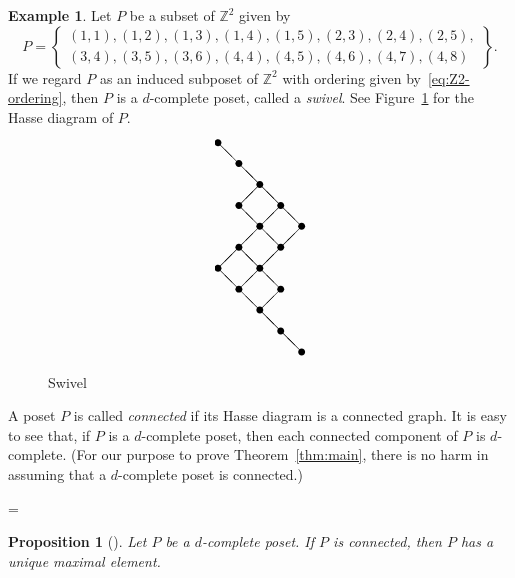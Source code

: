 \documentclass[10pt]{amsart}
\newtheorem{prop}[theo]{Proposition}
\theoremstyle{definition}
\newtheorem{exam}[theo]{Example}
\theoremstyle{remark}
\newcommand\Int{\mathbb{Z}}
\begin{document}
\begin{exam}
\label{ex:swivel}
Let $P$ be a subset of $\Int^2$ given by
$$
P =
\left\{ 
 \begin{array}{l}
 (1,1), (1,2), (1,3), (1,4), (1,5), (2,3), (2,4), (2,5), \\
 (3,4), (3,5), (3,6), (4,4), (4,5), (4,6), (4,7), (4,8)
 \end{array}
\right\}.
$$
If we regard $P$ as an induced subposet of $\Int^2$ with ordering given by~\eqref{eq:Z2-ordering}, 
then $P$ is a $d$-complete poset, called a \emph{swivel}.
See Figure~\ref{fig:Hasse_swivel} for the Hasse diagram of $P$.
\begin{figure}[!htb]
$$
\setlength{\unitlength}{1.5pt}
\begin{picture}(40,100)
\put(0,100){\circle*{3}}
\put(0,40){\circle*{3}}
\put(10,90){\circle*{3}}
\put(10,70){\circle*{3}}
\put(10,50){\circle*{3}}
\put(10,30){\circle*{3}}
\put(20,80){\circle*{3}}
\put(20,60){\circle*{3}}
\put(20,40){\circle*{3}}
\put(20,20){\circle*{3}}
\put(30,70){\circle*{3}}
\put(30,50){\circle*{3}}
\put(30,30){\circle*{3}}
\put(30,10){\circle*{3}}
\put(40,60){\circle*{3}}
\put(40,0){\circle*{3}}
\put(0,100){\line(1,-1){10}}
\put(0,40){\line(1,1){10}}
\put(0,40){\line(1,-1){10}}
\put(10,90){\line(1,-1){10}}
\put(10,70){\line(1,1){10}}
\put(10,70){\line(1,-1){10}}
\put(10,50){\line(1,1){10}}
\put(10,50){\line(1,-1){10}}
\put(10,30){\line(1,1){10}}
\put(10,30){\line(1,-1){10}}
\put(20,80){\line(1,-1){10}}
\put(20,60){\line(1,1){10}}
\put(20,60){\line(1,-1){10}}
\put(20,40){\line(1,1){10}}
\put(20,40){\line(1,-1){10}}
\put(20,20){\line(1,1){10}}
\put(20,20){\line(1,-1){10}}
\put(30,70){\line(1,-1){10}}
\put(30,50){\line(1,1){10}}
\put(30,10){\line(1,-1){10}}
\end{picture}
$$
\caption{Swivel}
\label{fig:Hasse_swivel}
\end{figure}
\end{exam}

A poset $P$ is called \emph{connected} if its Hasse diagram is a connected graph.
It is easy to see that, if $P$ is a $d$-complete poset, 
then each connected component of $P$ is $d$-complete.
(For our purpose to prove Theorem~\ref{thm:main}, 
there is no harm in assuming that a $d$-complete poset is connected.)

\newbox\toto
\setbox\toto=\hbox{\cite[\S~3]{Proc1}}
\begin{prop}[\box\toto]
\label{prop:dc_connected}
Let $P$ be a $d$-complete poset.
If $P$ is connected, then $P$ has a unique maximal element.
\end{prop}
\end{document}
